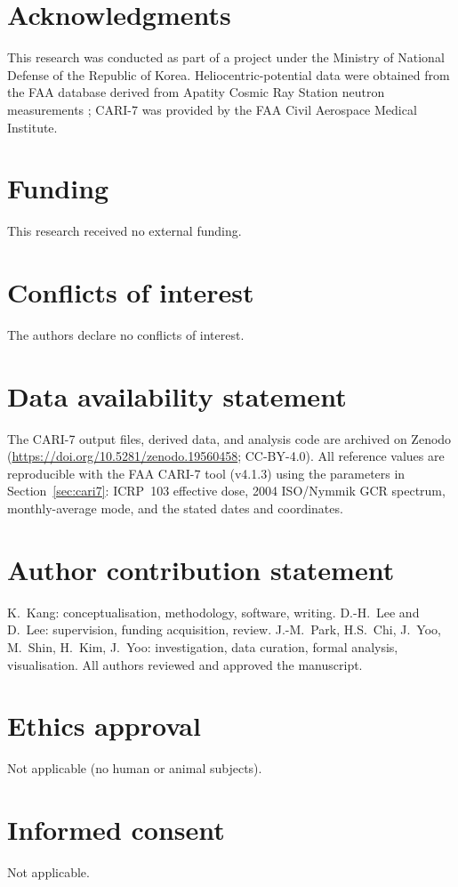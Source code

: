 \documentclass[11pt,a4paper]{article}
\begin{document}
\section*{Acknowledgments}
This research was conducted as part of a project under the Ministry of
National Defense of the Republic of Korea. Heliocentric-potential data
were obtained from the FAA database derived from Apatity Cosmic Ray
Station neutron measurements \citep{faahcp}; CARI-7 was provided by the
FAA Civil Aerospace Medical Institute.

\section*{Funding}
This research received no external funding.

\section*{Conflicts of interest}
The authors declare no conflicts of interest.

\section*{Data availability statement}
The CARI-7 output files, derived data, and analysis code are archived on
Zenodo (\url{https://doi.org/10.5281/zenodo.19560458}; CC-BY-4.0). All
reference values are reproducible with the FAA CARI-7 tool (v4.1.3) using
the parameters in Section~\ref{sec:cari7}: ICRP~103 effective dose, 2004
ISO/Nymmik GCR spectrum, monthly-average mode, and the stated dates and
coordinates.

\section*{Author contribution statement}
K.\ Kang: conceptualisation, methodology, software, writing.
D.-H.\ Lee and D.\ Lee: supervision, funding acquisition, review.
J.-M.\ Park, H.S.\ Chi, J.\ Yoo, M.\ Shin, H.\ Kim, J.\ Yoo:
investigation, data curation, formal analysis, visualisation. All authors
reviewed and approved the manuscript.

\section*{Ethics approval}
Not applicable (no human or animal subjects).

\section*{Informed consent}
Not applicable.



\end{document}

